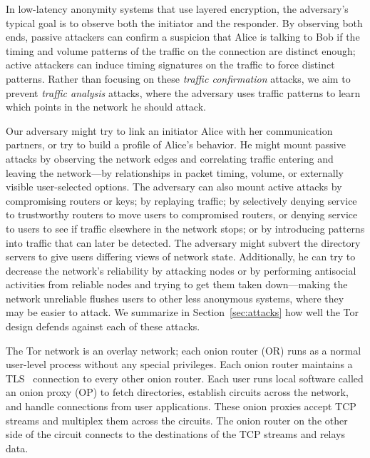 \documentclass[times,10pt,twocolumn]{article}
\begin{document}
In low-latency anonymity systems that use layered encryption, the
adversary's typical goal is to observe both the initiator and the
responder. By observing both ends, passive attackers can confirm a
suspicion that Alice is
talking to Bob if the timing and volume patterns of the traffic on the
connection are distinct enough; active attackers can induce timing
signatures on the traffic to force distinct patterns. Rather
than focusing on these \emph{traffic confirmation} attacks,
we aim to prevent \emph{traffic
analysis} attacks, where the adversary uses traffic patterns to learn
which points in the network he should attack.

Our adversary might try to link an initiator Alice with her
communication partners, or try to build a profile of Alice's
behavior. He might mount passive attacks by observing the network edges
and correlating traffic entering and leaving the network---by
relationships in packet timing, volume, or externally visible
user-selected
options. The adversary can also mount active attacks by compromising
routers or keys; by replaying traffic; by selectively denying service
to trustworthy routers to move users to
compromised routers, or denying service to users to see if traffic
elsewhere in the
network stops; or by introducing patterns into traffic that can later be
detected. The adversary might subvert the directory servers to give users
differing views of network state. Additionally, he can try to decrease
the network's reliability by attacking nodes or by performing antisocial
activities from reliable nodes and trying to get them taken down---making
the network unreliable flushes users to other less anonymous
systems, where they may be easier to attack. We summarize
in Section~\ref{sec:attacks} how well the Tor design defends against
each of these attacks.


\label{sec:design}

The Tor network is an overlay network; each onion router (OR)
runs as a normal
user-level process without any special privileges.
Each onion router maintains a TLS~\cite{TLS}
connection to every other onion router.
Each user
runs local software called an onion proxy (OP) to fetch directories,
establish circuits across the network,
and handle connections from user applications.  These onion proxies accept
TCP streams and multiplex them across the circuits. The onion
router on the other side
of the circuit connects to the destinations of
the TCP streams and relays data.
\end{document}
